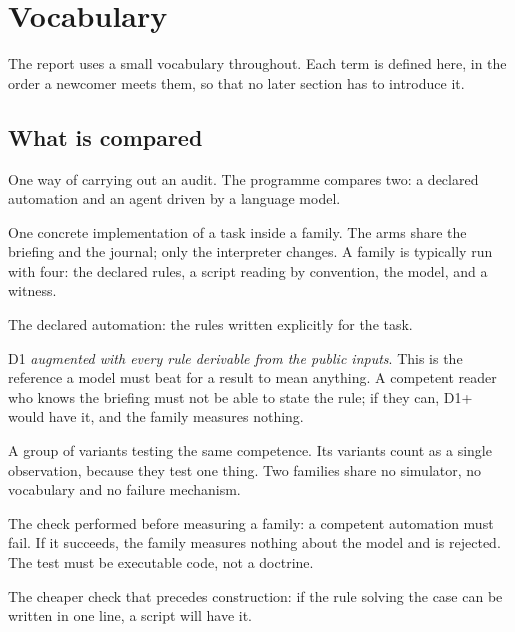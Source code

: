 \section{Vocabulary}

The report uses a small vocabulary throughout. Each term is defined here, in the
order a newcomer meets them, so that no later section has to introduce it.

\subsection{What is compared}

\begin{description}[leftmargin=3.1cm, style=nextline]
\item[Policy (politique)] One way of carrying out an audit. The programme
compares two: a declared automation and an agent driven by a language model.

\item[Arm (bras)] One concrete implementation of a task inside a family. The
arms share the briefing and the journal; only the interpreter changes. A family
is typically run with four: the declared rules, a script reading by convention,
the model, and a witness.

\item[D1] The declared automation: the rules written explicitly for the task.
\item[D1+] D1 \emph{augmented with every rule derivable from the public inputs}.
This is the reference a model must beat for a result to mean anything. A
competent reader who knows the briefing must not be able to state the rule; if
they can, D1+ would have it, and the family measures nothing.

\item[Family (famille)] A group of variants testing the same competence. Its
variants count as a single observation, because they test one thing. Two
families share no simulator, no vocabulary and no failure mechanism.

\item[Closure test (test de clôture)] The check performed before measuring a
family: a competent automation must fail. If it succeeds, the family measures
nothing about the model and is rejected. The test must be executable code, not a
doctrine.

\item[Filter (filtre préalable)] The cheaper check that precedes construction: if
the rule solving the case can be written in one line, a script will have it.
\end{description}

